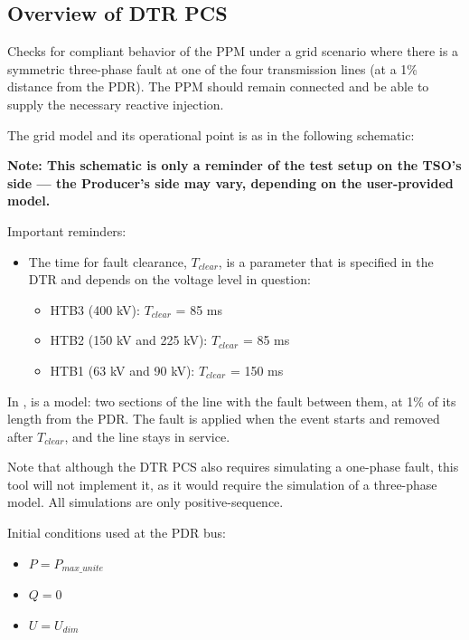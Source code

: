     \subsection{Overview of DTR PCS \DTRPcs}

    Checks for compliant behavior of the PPM under a grid scenario where there
    is a symmetric three-phase fault at one of the four transmission lines
    (at a 1\% distance from the PDR). The PPM should remain connected and
    be able to supply the necessary reactive injection.

    The grid model and its operational point is as in the following schematic:
    \begin{center}
        
    \end{center}
    \begin{center}
        \small \textbf{Note: This schematic is only a reminder of the test setup on the TSO's
        side --- the Producer's side may vary, depending on the user-provided model.}
    \end{center}

    \noindent Important reminders:
    \begin{itemize}
        \item The time for fault clearance, $T_{clear}$, is a parameter that
        is specified in the DTR and depends on the voltage level in
        question:
        \begin{itemize}
            \item HTB3 (400 kV): $T_{clear}$ = 85 ms
            \item HTB2 (150 kV and 225 kV): $T_{clear}$ = 85 ms
            \item HTB1 (63 kV and 90 kV): $T_{clear}$ = 150 ms
        \end{itemize}
    \end{itemize}

    In \Dynawo{},  is a  model: two sections of the
    line with the fault between them, at 1\% of its length from the PDR. The
    fault is applied when the event starts and removed after $T_{clear}$, and the
    line stays in service.

    Note that although the DTR PCS also requires simulating a one-phase
    fault, this tool will not implement it, as it would require the
    simulation of a three-phase model. All simulations are only
    positive-sequence.

    \begin{description}
        \item Initial conditions used at the PDR bus:
        \begin{itemize}
            \item $P = P_{max\_unite}$
            \item $Q = 0$
            \item $U = U_{dim}$
        \end{itemize}
    \end{description}

